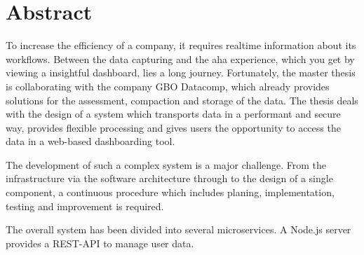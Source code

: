 \chapter*{Abstract}
\label{chap:abstract}

To increase the efficiency of a company, it requires realtime
information about its workflows. Between the data capturing
and the aha experience, which you get by viewing a 
insightful dashboard, lies a long journey. Fortunately,
the master thesis is collaborating with the company GBO Datacomp,
which already provides solutions for the assessment, compaction and
storage of the data. The thesis deals with the design of a system
which transports data in a performant and secure way, provides
flexible processing and gives users the opportunity to access
the data in a web-based dashboarding tool.

The development of such a complex system is a major challenge.
From the infrastructure via the software architecture through to
the design of a single component, a continuous procedure which includes
planing, implementation, testing and improvement is required.

The overall system has been divided into several microservices. A Node.js
server provides a REST-API to manage user data. 